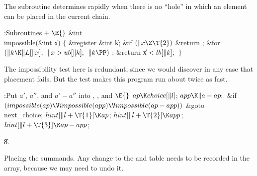 The  subroutine determines rapidly
when there is no
``hole'' in which an element can be placed in the current chain.

\Y\B\4:Subroutines\X${}\mathrel+\E{}$\6
\&{int} \\{impossible}(\&{int} \|x)\6
${}\{{}$\1\6
\&{register} \&{int} \|k;\7
\&{if} ${}(\|x\Z\T{2}){}$\1\5
\&{return} ;\2\6
\&{for} ${}(\|k\K\|L[\|x];{}$ ${}\|x>\\{ub}[\|k];{}$ ${}\|k\PP){}$\1\5
;\2\6
\&{return} \|x${}<\\{lb}[\|k];{}$\6
\4${}\}{}$\2\par
\fi

The impossibility test here is redundant, since we
would discover in any
case that placement fails. But the test makes this program run
about twice as fast.

\Y\B\4:Put $a'$, $a''$, and $a'-a''$ into , , and \X${}\E{}$\6
$\\{ap}\K\\{choice}[\|l]{}$;\5
${}\\{app}\K\|a-\\{ap};{}$\6
\&{if} ${}(\\{impossible}(\\{ap})\V\\{impossible}(\\{app})\V\\{impossible}(%
\\{ap}-\\{app})){}$\1\5
\&{goto} \\{next\_choice};\2\6
${}\\{hint}[\|l+\T{1}]\K\\{ap}{}$;\5
${}\\{hint}[\|l+\T{2}]\K\\{app}{}$;\5
${}\\{hint}[\|l+\T{3}]\K\\{ap}-\\{app}{}$;\par
\U8.\fi

Placing the summands. Any change to the 
and  table needs to
be recorded in the  array, because we may need to undo it.

